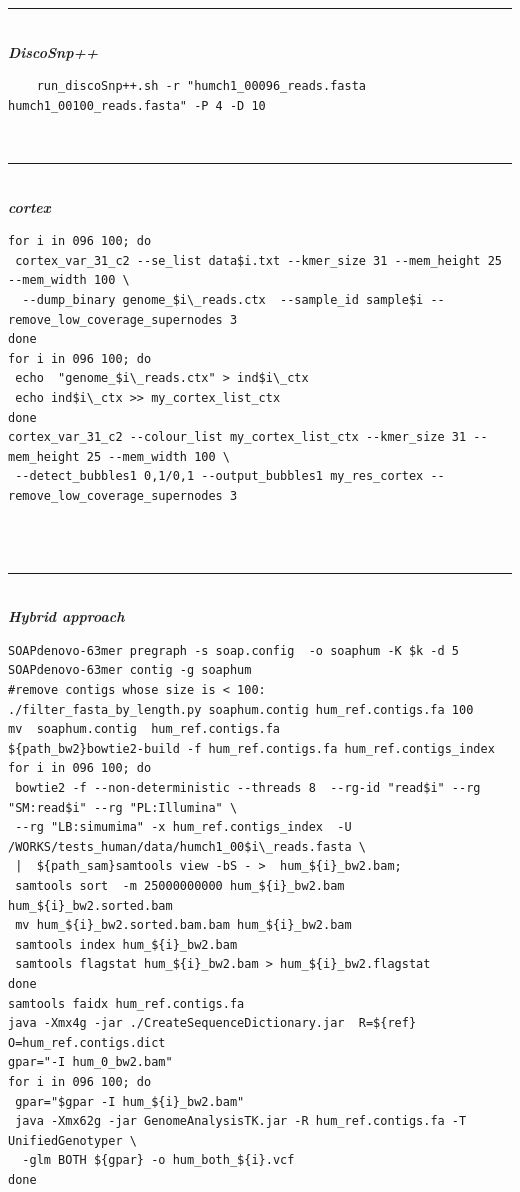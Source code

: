 \documentclass{bmcart}
\newcommand{\discopp}{{\it DiscoSnp++}\xspace}
\newcommand{\co}{{\it cortex}\xspace}
\begin{document}
\begin{table}[ht]
	\hrule~\\
\emph\textbf{{\discopp}}
	\scriptsize\begin{verbatim}
	run_discoSnp++.sh -r "humch1_00096_reads.fasta humch1_00100_reads.fasta" -P 4 -D 10
	\end{verbatim}	\normalsize
~\hrule~\\
\emph\textbf{{\co}}
\scriptsize\begin{verbatim}
for i in 096 100; do
 cortex_var_31_c2 --se_list data$i.txt --kmer_size 31 --mem_height 25 --mem_width 100 \
  --dump_binary genome_$i\_reads.ctx  --sample_id sample$i --remove_low_coverage_supernodes 3
done
for i in 096 100; do
 echo  "genome_$i\_reads.ctx" > ind$i\_ctx
 echo ind$i\_ctx >> my_cortex_list_ctx
done
cortex_var_31_c2 --colour_list my_cortex_list_ctx --kmer_size 31 --mem_height 25 --mem_width 100 \
 --detect_bubbles1 0,1/0,1 --output_bubbles1 my_res_cortex --remove_low_coverage_supernodes 3 
 
	\end{verbatim}	\normalsize
~\hrule~\\
\emph\textbf{Hybrid approach}
\scriptsize\begin{verbatim}
SOAPdenovo-63mer pregraph -s soap.config  -o soaphum -K $k -d 5 
SOAPdenovo-63mer contig -g soaphum
#remove contigs whose size is < 100:
./filter_fasta_by_length.py soaphum.contig hum_ref.contigs.fa 100
mv  soaphum.contig  hum_ref.contigs.fa
${path_bw2}bowtie2-build -f hum_ref.contigs.fa hum_ref.contigs_index 
for i in 096 100; do
 bowtie2 -f --non-deterministic --threads 8  --rg-id "read$i" --rg "SM:read$i" --rg "PL:Illumina" \ 
 --rg "LB:simumima" -x hum_ref.contigs_index  -U /WORKS/tests_human/data/humch1_00$i\_reads.fasta \ 
 |  ${path_sam}samtools view -bS - >  hum_${i}_bw2.bam;
 samtools sort  -m 25000000000 hum_${i}_bw2.bam hum_${i}_bw2.sorted.bam
 mv hum_${i}_bw2.sorted.bam.bam hum_${i}_bw2.bam
 samtools index hum_${i}_bw2.bam
 samtools flagstat hum_${i}_bw2.bam > hum_${i}_bw2.flagstat
done
samtools faidx hum_ref.contigs.fa
java -Xmx4g -jar ./CreateSequenceDictionary.jar  R=${ref}  O=hum_ref.contigs.dict
gpar="-I hum_0_bw2.bam"
for i in 096 100; do
 gpar="$gpar -I hum_${i}_bw2.bam"
 java -Xmx62g -jar GenomeAnalysisTK.jar -R hum_ref.contigs.fa -T UnifiedGenotyper \
  -glm BOTH ${gpar} -o hum_both_${i}.vcf
done
	\end{verbatim}	\normalsize
	\caption{Commands used for calling SNPs and indels from two human chromosome 1 read sets (humch1\_00096\_reads.fasta humch1\_00100\_reads.fasta) with \discopp, \co or the hybrid approach. \label{tab:humancommands}}
\end{table}
\end{document}
